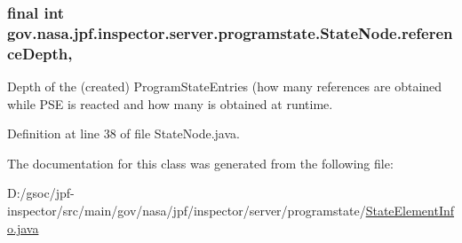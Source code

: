 \subsubsection[{\texorpdfstring{reference\+Depth}{referenceDepth}}]{\setlength{\rightskip}{0pt plus 5cm}final int gov.\+nasa.\+jpf.\+inspector.\+server.\+programstate.\+State\+Node.\+reference\+Depth\hspace{0.3cm}{\ttfamily [protected]}, {\ttfamily [inherited]}}\hypertarget{classgov_1_1nasa_1_1jpf_1_1inspector_1_1server_1_1programstate_1_1_state_node_a55683618625dae46e8aa68d95811d6bb}{}\label{classgov_1_1nasa_1_1jpf_1_1inspector_1_1server_1_1programstate_1_1_state_node_a55683618625dae46e8aa68d95811d6bb}


Depth of the (created) Program\+State\+Entries (how many references are obtained while P\+SE is reacted and how many is obtained at runtime. 



Definition at line 38 of file State\+Node.\+java.



The documentation for this class was generated from the following file\+:\begin{DoxyCompactItemize}
\item 
D\+:/gsoc/jpf-\/inspector/src/main/gov/nasa/jpf/inspector/server/programstate/\hyperlink{_state_element_info_8java}{State\+Element\+Info.\+java}\end{DoxyCompactItemize}
